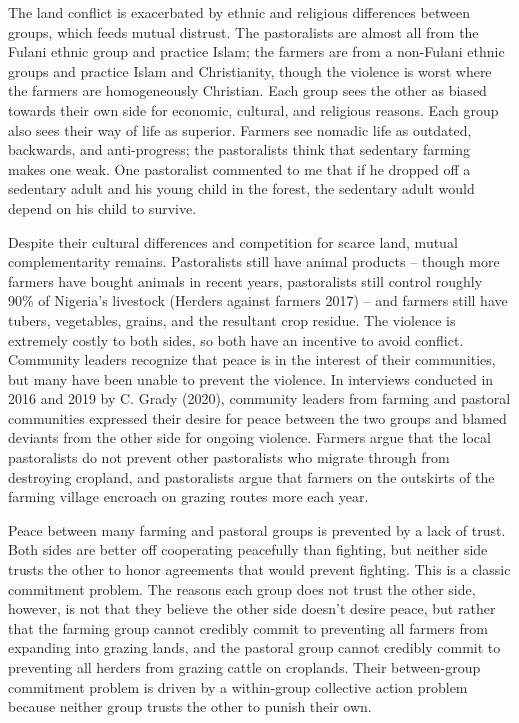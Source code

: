 \documentclass[11pt]{article}
\begin{document}
The land conflict is exacerbated by ethnic and religious differences
between groups, which feeds mutual distrust. The pastoralists are almost
all from the Fulani ethnic group and practice Islam; the farmers are
from a non-Fulani ethnic groups and practice Islam and Christianity,
though the violence is worst where the farmers are homogeneously
Christian. Each group sees the other as biased towards their own side
for economic, cultural, and religious reasons. Each group also sees
their way of life as superior. Farmers see nomadic life as outdated,
backwards, and anti-progress; the pastoralists think that sedentary
farming makes one weak. One pastoralist commented to me that if he
dropped off a sedentary adult and his young child in the forest, the
sedentary adult would depend on his child to survive.

Despite their cultural differences and competition for scarce land,
mutual complementarity remains. Pastoralists still have animal products
-- though more farmers have bought animals in recent years, pastoralists
still control roughly 90\% of Nigeria's livestock (Herders against
farmers 2017) -- and farmers still have tubers, vegetables, grains, and
the resultant crop residue. The violence is extremely costly to both
sides, so both have an incentive to avoid conflict. Community leaders
recognize that peace is in the interest of their communities, but many
have been unable to prevent the violence. In interviews conducted in
2016 and 2019 by C. Grady (2020), community leaders from farming and
pastoral communities expressed their desire for peace between the two
groups and blamed deviants from the other side for ongoing violence.
Farmers argue that the local pastoralists do not prevent other
pastoralists who migrate through from destroying cropland, and
pastoralists argue that farmers on the outskirts of the farming village
encroach on grazing routes more each year.

Peace between many farming and pastoral groups is prevented by a lack of
trust. Both sides are better off cooperating peacefully than fighting,
but neither side trusts the other to honor agreements that would prevent
fighting. This is a classic commitment problem. The reasons each group
does not trust the other side, however, is not that they believe the
other side doesn't desire peace, but rather that the farming group
cannot credibly commit to preventing all farmers from expanding into
grazing lands, and the pastoral group cannot credibly commit to
preventing all herders from grazing cattle on croplands. Their
between-group commitment problem is driven by a within-group collective
action problem because neither group trusts the other to punish their
own.
\end{document}
